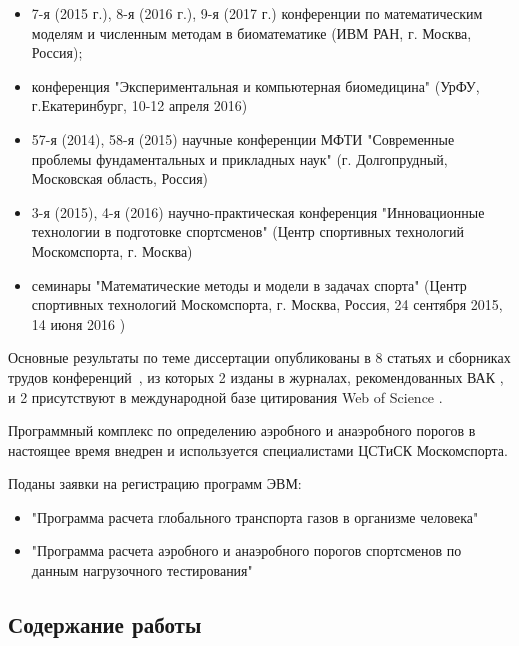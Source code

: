 \noindent
\begin{itemize}
  
  \item 7-я (2015 г.), 8-я (2016 г.), 9-я (2017 г.) конференции по математическим моделям и численным методам в биоматематике (ИВМ РАН, г. Москва, Россия); 
  
  \item конференция "Экспериментальная и компьютерная биомедицина" (УрФУ, г.Екатеринбург, 10-12 апреля 2016)
  
  \item 57-я (2014), 58-я (2015) научные конференции МФТИ "Современные проблемы фундаментальных и прикладных наук" (г. Долгопрудный, Московская область, Россия)
  
  \item 3-я (2015), 4-я (2016) научно-практическая конференция "Инновационные технологии в подготовке спортсменов" (Центр спортивных технологий Москомспорта, г. Москва)
  
  \item семинары "Математические методы и модели в задачах спорта" (Центр спортивных технологий Москомспорта, г. Москва, Россия, 24 сентября 2015, 14 июня 2016 )
\end{itemize}

Основные результаты по теме диссертации опубликованы в 8 статьях и сборниках трудов конференций~\cite{GolovComp2017, GolovCmodel2017, GolovIt2017,GolovSp2015,GolovSp2016,TimmeSp2016,GolovEkb2016,Simakov2015}, из которых 2 изданы в журналах, рекомендованных ВАК \cite{GolovIt2017, GolovCmodel2017}, и 2 присутствуют в международной базе цитирования Web of Science \cite{GolovComp2017, GolovCmodel2017}.

Программный комплекс по определению аэробного и анаэробного порогов в настоящее время внедрен и используется специалистами ЦСТиСК Москомспорта.

Поданы заявки на регистрацию программ ЭВМ:
\begin{itemize}
    \item "Программа расчета глобального транспорта газов в организме человека"
    \item "Программа расчета аэробного и анаэробного порогов спортсменов по данным нагрузочного тестирования"
\end{itemize}
 
\subsection*{\Large Содержание работы}

